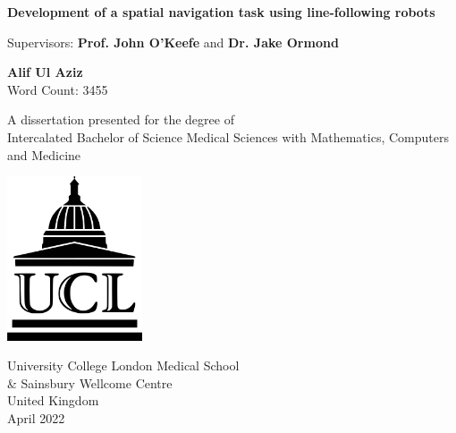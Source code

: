 \documentclass{article}
\newcommand{\detailtexcount}[1]{%
  \immediate\write18{texcount -merge -sum -q #1.tex output.bbl > #1.wcdetail }%
}
\newcommand{\quickwordcount}[1]{%
  \immediate\write18{texcount -1 -sum -merge -q #1.tex output.bbl > #1-words.sum }%
   words%
}
\newcommand{\quickcharcount}[1]{%
  \immediate\write18{texcount -1 -sum -merge -char -q #1.tex output.bbl > #1-chars.sum }%
   characters (not including spaces)%
}
\begin{document}
\doublespacing

\begin{titlepage}
   \begin{center}
       \vspace*{0.5cm}
    \large
       \textbf{Development of a spatial navigation task using line-following robots}

       \vspace{0.5cm}
        Supervisors: \textbf{Prof. John O'Keefe} and \textbf{Dr. Jake Ormond}
            
       \vspace{1.5cm}

       \textbf{Alif Ul Aziz} \\
       Word Count: 3455
       \vfill
            
       A dissertation presented for the degree of\\
       Intercalated Bachelor of Science Medical Sciences with Mathematics, Computers and Medicine
            
       \vspace{0.8cm}
     
       \includegraphics[width=0.3\textwidth]{images/ucl_logo.png}
    
        \vspace{1 cm}
       University College London Medical School \\ \& Sainsbury Wellcome Centre\\
       United Kingdom\\
       April 2022
            
   \end{center}
\end{titlepage}




\pagebreak
\end{document}
